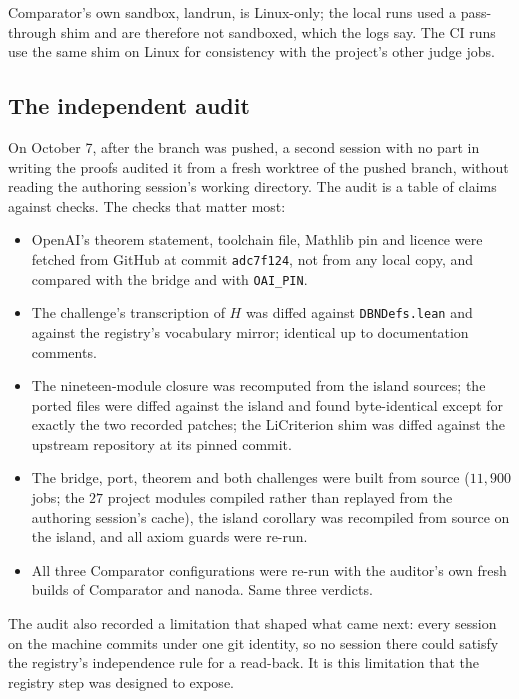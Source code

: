 \documentclass[11pt]{article}
\theoremstyle{definition}
\newcommand{\lean}[1]{\texttt{#1}}
\newcommand{\Hfun}{H}
\begin{document}
Comparator's own sandbox, landrun, is Linux-only; the local runs used a pass-through shim and are therefore not sandboxed, which the logs say. The CI runs use the same shim on Linux for consistency with the project's other judge jobs.

\subsection{The independent audit}

On October 7, after the branch was pushed, a second session with no part in writing the proofs audited it from a fresh worktree of the pushed branch, without reading the authoring session's working directory. The audit \cite{Repo} is a table of claims against checks. The checks that matter most:

\begin{itemize}[leftmargin=*]
\item OpenAI's theorem statement, toolchain file, Mathlib pin and licence were fetched from GitHub at commit \lean{adc7f124}, not from any local copy, and compared with the bridge and with \lean{OAI\_PIN}.
\item The challenge's transcription of $\Hfun$ was diffed against \lean{DBNDefs.lean} and against the registry's vocabulary mirror; identical up to documentation comments.
\item The nineteen-module closure was recomputed from the island sources; the ported files were diffed against the island and found byte-identical except for exactly the two recorded patches; the LiCriterion shim was diffed against the upstream repository at its pinned commit.
\item The bridge, port, theorem and both challenges were built from source ($11{,}900$ jobs; the $27$ project modules compiled rather than replayed from the authoring session's cache), the island corollary was recompiled from source on the island, and all axiom guards were re-run.
\item All three Comparator configurations were re-run with the auditor's own fresh builds of Comparator and nanoda. Same three verdicts.
\end{itemize}

The audit also recorded a limitation that shaped what came next: every session on the machine commits under one git identity, so no session there could satisfy the registry's independence rule for a read-back. It is this limitation that the registry step was designed to expose.
\end{document}
